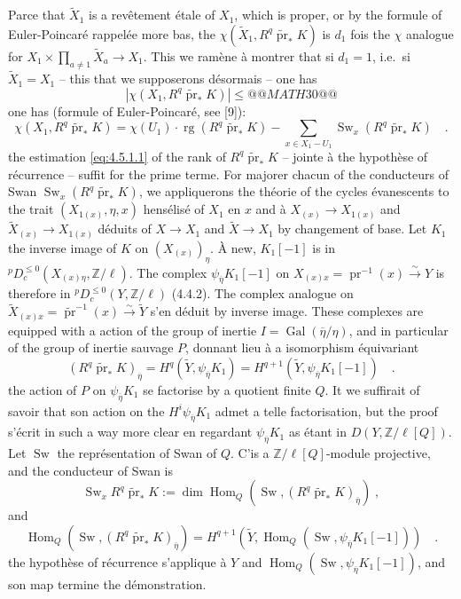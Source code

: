 \documentclass[12pt,a4paper]{article}
\theoremstyle{plain}
\theoremstyle{definition}
\DeclareMathOperator{\Hom}{Hom}
\DeclareMathOperator{\Gal}{Gal}
\DeclareMathOperator{\rg}{rg}
\DeclareMathOperator{\Sw}{Sw}
\newcommand{\isom}{\xrightarrow{\sim}}
\providecommand{\Hom}{\operatorname{Hom}}
\providecommand{\Gal}{\operatorname{Gal}}
\providecommand{\pr}{\operatorname{pr}}
\begin{document}
{{Parce that $\tilde{X}_{1}$ is a rev\^{e}tement \'{e}tale of $X_{1}$, which is proper, or by the formule of Euler-Poincar\'{e} rappel\'{e}e more bas, the $\chi(\tilde{X}_{1}, R^{q}\tilde{\pr}_{*}K)$ is $d_{1}$ fois the $\chi$ analogue for $X_{1} \times \prod_{a \neq 1} \tilde{X}_{a} \to X_{1}$. This we ram\`{e}ne \`{a} montrer that si $d_{1} = 1$, i.e.\ si $\tilde{X}_{1} = X_{1}$ -- this that we supposerons d\'{e}sormais -- one has
\[
|\chi(X_{1}, R^{q}\tilde{\pr}_{*}K)| \leq
@@MATH30@@
\]
one has (formule of Euler-Poincar\'{e}, see [9]):
\[
\chi(X_{1}, R^{q}\tilde{\pr}_{*}K) = \chi(U_{1}) \cdot \rg(R^{q}\tilde{\pr}_{*}K) - \sum_{x \in X_{1}-U_{1}} \Sw_{x}(R^{q}\tilde{\pr}_{*}K)\quad.
\]
the estimation \eqref{eq:4.5.1.1} of the rank of $R^{q}\tilde{\pr}_{*}K$ -- jointe \`{a} the hypoth\`{e}se of r\'{e}currence -- suffit for the prime terme. For majorer chacun of the conducteurs of Swan $\Sw_{x}(R^{q}\tilde{\pr}_{*}K)$, we appliquerons the th\'{e}orie of the cycles \'{e}vanescents to the trait $(X_{1(x)}, \eta, x)$ hens\'{e}lis\'{e} of $X_{1}$ en $x$ and \`{a} $X_{(x)} \to X_{1(x)}$ and $\tilde{X}_{(x)} \to X_{1(x)}$ d\'{e}duits of $X \to X_{1}$ and $\tilde{X} \to X_{1}$ by changement of base. Let $K_{1}$ the inverse image of $K$ on $(X_{(x)})_{\eta}$. \`{A} new, $K_{1}[-1]$ is in ${}^{p}D_{c}^{\leq 0}(X_{(x)\eta}, \mathbb{Z}/\ell)$. The complex $\psi_{\overline{\eta}}K_{1}[-1]$ on $X_{(x)x} = \pr^{-1}(x) \isom Y$ is therefore in ${}^{p}D_{c}^{\leq 0}(Y, \mathbb{Z}/\ell)$ (4.4.2). The complex analogue on $\tilde{X}_{(x)x} = \tilde{\pr}^{-1}(x) \isom \tilde{Y}$ s'en d\'{e}duit by inverse image. These complexes are equipped with a action of the group of inertie $I = \Gal(\overline{\eta}/\eta)$, and in particular of the group of inertie sauvage $P$, donnant lieu \`{a} a isomorphism \'{e}quivariant
\[
(R^{q}\tilde{\pr}_{*}K)_{\overline{\eta}} = H^{q}(\tilde{Y}, \psi_{\overline{\eta}}K_{1}) = H^{q+1}(\tilde{Y}, \psi_{\overline{\eta}}K_{1}[-1])\quad.
\]
the action of $P$ on $\psi_{\overline{\eta}}K_{1}$ se factorise by a quotient finite $Q$. It we suffirait of savoir that son action on the $H^{i}\psi_{\overline{\eta}}K_{1}$ admet a telle factorisation, but the proof s'\'{e}crit in such a way more clear en regardant $\psi_{\overline{\eta}}K_{1}$ as \'{e}tant in $D(Y, \mathbb{Z}/\ell[Q])$. Let $\Sw$ the repr\'{e}sentation of Swan of $Q$. C'is a $\mathbb{Z}/\ell[Q]$-module projective, and the conducteur of Swan is
\[
\Sw_{x} R^{q}\tilde{\pr}_{*}K := \dim \Hom_{Q}(\Sw, (R^{q}\tilde{\pr}_{*}K)_{\overline{\eta}})\;,
\]
and
\[
\Hom_{Q}(\Sw, (R^{q}\tilde{\pr}_{*}K)_{\overline{\eta}}) = H^{q+1}(\tilde{Y}, \Hom_{Q}(\Sw, \psi_{\overline{\eta}}K_{1}[-1]))\quad.
\]
the hypoth\`{e}se of r\'{e}currence s'applique \`{a} $Y$ and $\Hom_{Q}(\Sw, \psi_{\overline{\eta}}K_{1}[-1])$, and son map termine the d\'{e}monstration.

}}
\end{document}
